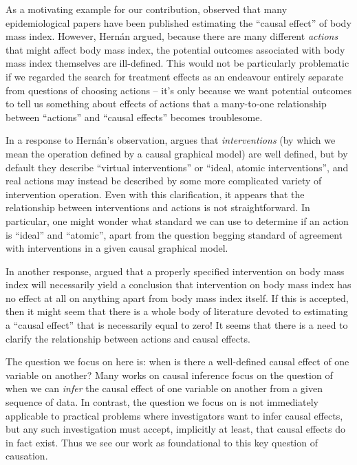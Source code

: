 \documentclass{article}
\theoremstyle{plain}
\theoremstyle{definition}
\begin{document}
As a motivating example for our contribution, \citet{hernan_does_2008} observed that many epidemiological papers have been published estimating the ``causal effect'' of body mass index. However, Hernán argued, because there are many different \emph{actions} that might affect body mass index, the potential outcomes associated with body mass index themselves are ill-defined. This would not be particularly problematic if we regarded the search for treatment effects as an endeavour entirely separate from questions of choosing actions -- it's only because we want potential outcomes to tell us something about effects of actions that a many-to-one relationship between ``actions'' and ``causal effects'' becomes troublesome.

In a response to Hernán's observation, \citet{pearl_does_2018} argues that \emph{interventions} (by which we mean the operation defined by a causal graphical model) are well defined, but by default they describe ``virtual interventions'' or ``ideal, atomic interventions'', and real actions may instead be described by some more complicated variety of intervention operation. Even with this clarification, it appears that the relationship between interventions and actions is not straightforward. In particular, one might wonder what standard we can use to determine if an action is ``ideal'' and ``atomic'', apart from the question begging standard of agreement with interventions in a given causal graphical model.

In another response, \citet{shahar_association_2009} argued that a properly specified intervention on body mass index will necessarily yield a conclusion that intervention on body mass index has no effect at all on anything apart from body mass index itself. If this is accepted, then it might seem that there is a whole body of literature devoted to estimating a ``causal effect'' that is necessarily equal to zero! It seems that there is a need to clarify the relationship between actions and causal effects.

The question we focus on here is: when is there a well-defined causal effect of one variable on another? Many works on causal inference focus on the question of when we can \emph{infer} the causal effect of one variable on another from a given sequence of data. In contrast, the question we focus on is not immediately applicable to practical problems where investigators want to infer causal effects, but any such investigation must accept, implicitly at least, that causal effects do in fact exist. Thus we see our work as foundational to this key question of causation. 
\end{document}

